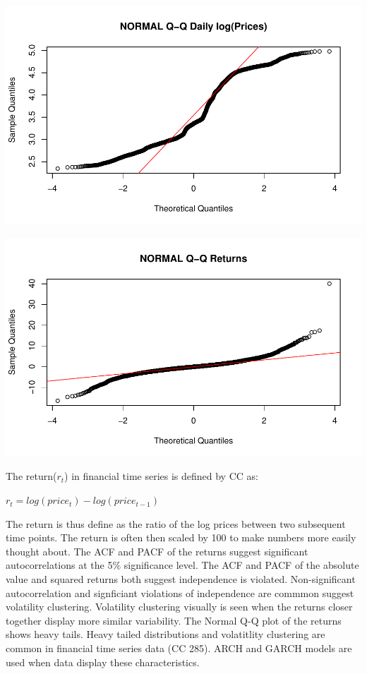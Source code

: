 \documentclass[11pt]{article}\usepackage[]{graphicx}\usepackage[]{color}
\makeatletter
\def\maxwidth{ %
  \ifdim\Gin@nat@width>\linewidth
    \linewidth
  \else
    \Gin@nat@width
  \fi
}
\newenvironment{knitrout}{}{} %
\makeatother
\begin{document}
\begin{knitrout}
{}




{\centering \includegraphics[width=\maxwidth]{figure/norm-4} 

}




{\centering \includegraphics[width=\maxwidth]{figure/norm-5} 

}



\end{knitrout}

The return($r_{t}$) in financial time series is defined by CC as:

$r_{t} = log(price_{t}) - log(price_{t-1})$

The return is thus define as the ratio of the log prices between two subsequent time points. The return is often then scaled by 100 to make numbers more easily thought about. The ACF and PACF of the returns suggest significant autocorrelations at the 5\% significance level. The ACF and PACF of the absolute value and squared returns both suggest independence is violated. Non-significant autocorrelation and signficiant violations of independence are commmon suggest volatility clustering. Volatility clustering visually is seen when the returns closer together display more similar variability. The Normal Q-Q plot of the returns shows heavy tails. Heavy tailed distributions and volatitlity clustering are common in financial time series data (CC 285). ARCH and GARCH models are used when data display these characteristics. 
\end{document}
